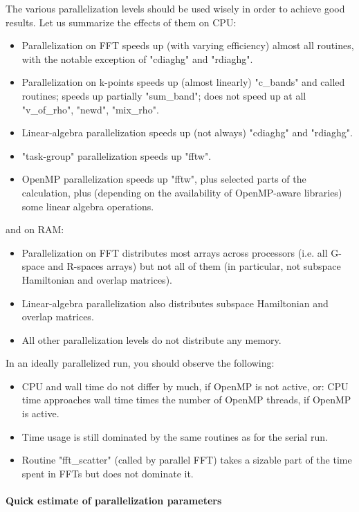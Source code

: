 \documentclass[12pt,a4paper]{article}
\begin{document}
The various parallelization levels should be used wisely in order to 
achieve good results. Let us summarize the effects of them on CPU:
\begin{itemize}
\item
  Parallelization on FFT speeds up (with varying efficiency) almost 
  all routines, with the notable exception of "cdiaghg" and "rdiaghg".
\item
  Parallelization on k-points speeds up (almost linearly) "c\_bands" and 
  called routines; speeds up partially "sum\_band"; does not speed up
  at all "v\_of\_rho", "newd", "mix\_rho".
\item
  Linear-algebra parallelization speeds up (not always) "cdiaghg"
  and "rdiaghg".
\item
  "task-group" parallelization speeds up "fftw".
\item
  OpenMP parallelization speeds up "fftw", plus selected parts of the 
  calculation, plus (depending on the availability of OpenMP-aware
  libraries) some linear algebra operations.
\end{itemize}
and on RAM:
\begin{itemize}
\item
  Parallelization on FFT distributes most arrays across processors
  (i.e. all G-space and R-spaces arrays) but not all of them (in
  particular, not subspace Hamiltonian and overlap matrices).
\item
  Linear-algebra parallelization also distributes subspace Hamiltonian
  and overlap matrices.
\item
  All other parallelization levels do not distribute any memory.
\end{itemize}
In an ideally parallelized run, you should observe the following:
\begin{itemize}
\item
  CPU and wall time do not differ by much, if OpenMP is not active, or:
  CPU time approaches wall time times the number of OpenMP threads,
  if OpenMP is active.
\item
  Time usage is still dominated by the same routines as for the serial run.
\item
  Routine "fft\_scatter" (called by parallel FFT) takes a sizable part of
  the time spent in FFTs but does not dominate it.
\end{itemize}

\paragraph{Quick estimate of parallelization parameters}
\end{document}
